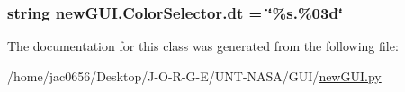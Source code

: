 \subsubsection[{\texorpdfstring{dt}{dt}}]{\setlength{\rightskip}{0pt plus 5cm}string new\+G\+U\+I.\+Color\+Selector.\+dt = \char`\"{}\%s.\%03d\char`\"{}\hspace{0.3cm}{\ttfamily [static]}}\hypertarget{classnewGUI_1_1ColorSelector_a13ddd2062c3a0a3c5cd4382914c89280}{}\label{classnewGUI_1_1ColorSelector_a13ddd2062c3a0a3c5cd4382914c89280}


The documentation for this class was generated from the following file\+:\begin{DoxyCompactItemize}
\item 
/home/jac0656/\+Desktop/\+J-\/\+O-\/\+R-\/\+G-\/\+E/\+U\+N\+T-\/\+N\+A\+S\+A/\+G\+U\+I/\hyperlink{newGUI_8py}{new\+G\+U\+I.\+py}\end{DoxyCompactItemize}
